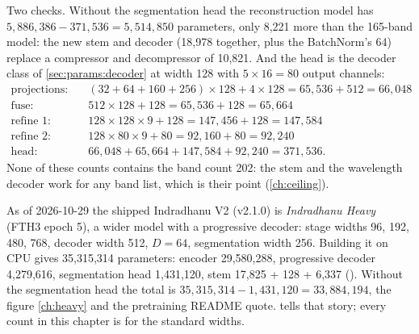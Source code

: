 Two checks. Without the segmentation head the reconstruction model has $5{,}886{,}386 - 371{,}536 =
5{,}514{,}850$ parameters, only 8,221 more than the 165-band model: the new stem and decoder (18,978
together, plus the BatchNorm's 64) replace a compressor and decompressor of 10,821. And the head is the
decoder class of \cref{sec:params:decoder} at width 128 with $5 \times 16 = 80$ output channels:
\begin{align*}
\text{projections:}\quad & (32 + 64 + 160 + 256) \times 128 + 4 \times 128 = 65{,}536 + 512 = 66{,}048\\
\text{fuse:}\quad & 512 \times 128 + 128 = 65{,}536 + 128 = 65{,}664\\
\text{refine 1:}\quad & 128 \times 128 \times 9 + 128 = 147{,}456 + 128 = 147{,}584\\
\text{refine 2:}\quad & 128 \times 80 \times 9 + 80 = 92{,}160 + 80 = 92{,}240\\
\text{head:}\quad & 66{,}048 + 65{,}664 + 147{,}584 + 92{,}240 = 371{,}536 .
\end{align*}
None of these counts contains the band count 202: the stem and the wavelength decoder work for any band
list, which is their point (\cref{ch:ceiling}).

\begin{drift}
As of 2026-10-29 the shipped Indradhanu V2 (v2.1.0) is \emph{Indradhanu Heavy} (FTH3 epoch 5), a wider
model with a progressive decoder: stage widths 96, 192, 480, 768, decoder width 512, $D = 64$,
segmentation width 256.
Building it on CPU gives 35,315,314 parameters\tagC: encoder 29,580,288, progressive decoder
4,279,616, segmentation head 1,431,120, stem 17,825 + 128 + 6,337
(). Without the segmentation head the total is
$35{,}315{,}314 - 1{,}431{,}120 = 33{,}884{,}194$, the figure \cref{ch:heavy} and the pretraining README
quote.  tells that story; every
count in this chapter is for the standard widths.
\end{drift}

